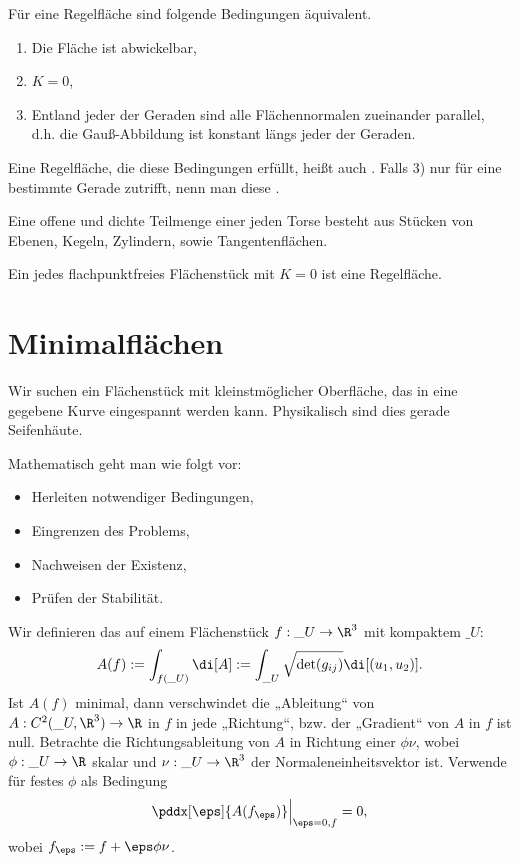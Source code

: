 \begin{st}
	Für eine Regelfläche sind folgende Bedingungen äquivalent.
	\begin{enumerate}[1)]
		\item
			Die Fläche ist abwickelbar,
		\item
			$K = 0$,
		\item
			Entland jeder der Geraden sind alle Flächennormalen zueinander parallel, d.h. die Gauß-Abbildung ist konstant längs jeder der Geraden.
	\end{enumerate}
	Eine Regelfläche, die diese Bedingungen erfüllt, heißt auch .
	Falls 3) nur für eine bestimmte Gerade zutrifft, nenn man diese .

	Eine offene und dichte Teilmenge einer jeden Torse besteht aus Stücken von Ebenen, Kegeln, Zylindern, sowie Tangentenflächen.

	Ein jedes flachpunktfreies Flächenstück mit $K = 0$ ist eine Regelfläche.
\end{st}



\section{Minimalflächen}

Wir suchen ein Flächenstück mit kleinstmöglicher Oberfläche, das in eine gegebene Kurve eingespannt werden kann.
Physikalisch sind dies gerade Seifenhäute.

Mathematisch geht man wie folgt vor:
\begin{itemize}
	\item
		Herleiten notwendiger Bedingungen,
	\item
		Eingrenzen des Problems,
	\item
		Nachweisen der Existenz,
	\item
		Prüfen der Stabilität.
\end{itemize}

Wir definieren das  auf einem Flächenstück $f: \_U \to \R^3$ mit kompaktem $\_U$:
\[
	A(f) := \int_{f(\_U)} \di[A]
	:= \int_{\_U} \sqrt{\det (g_{ij})} \di[(u_1,u_2)].
\]
Ist $A(f)$ minimal, dann verschwindet die „Ableitung“ von $A: C^2(\_U, \R^3) \to \R$ in $f$ in jede „Richtung“, bzw. der „Gradient“ von $A$ in $f$ ist null.
Betrachte die Richtungsableitung von $A$ in Richtung einer  $\phi \nu$, wobei $\phi: \_U \to \R$ skalar und $\nu: \_U \to \R^3$ der Normaleneinheitsvektor ist.
Verwende für festes $\phi$ als Bedingung
\[
	\pddx[\eps]{A(f_\eps)} \Big|_{\eps = 0, f} = 0,
\]
wobei $f_\eps := f + \eps \phi \nu$.

